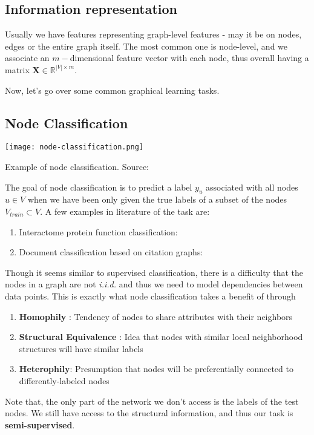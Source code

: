 \subsection{Information representation}
Usually we have features representing graph-level features - may it be on nodes, edges or the entire graph itself. The most common one is node-level, and we associate an $m-$dimensional feature vector with each node, thus overall having a matrix $\mathbf{X} \in \mathbb{R}^{|V| \times m}$.

Now, let's go over some common graphical learning tasks.
\subsection{Node Classification}
	\begin{marginfigure}
	\texttt{[image: node-classification.png]}
	\caption{Example of node classification. Source: \cite{node-classification-survey}}
	\label{fig:node-classification}
\end{marginfigure}
The goal of node classification is to predict a label $y_u$ associated with all nodes $u \in V$ when we have been only given the true labels of a subset of the nodes $V_{train} \subset V$. A few examples in literature of the task are:
\begin{enumerate}
	\item Interactome protein function classification: \cite{graphsage}
	\item Document classification based on citation graphs: \cite{gcn}
\end{enumerate}
Though it seems similar to supervised classification, there is a difficulty that the nodes in a graph are not \textit{i.i.d.} and thus we need to model dependencies between data points. This is exactly what node classification takes a benefit of through 
\begin{enumerate}
	\item \textbf{Homophily} \cite{homophily}: Tendency of nodes to share attributes with their neighbors
	\item \textbf{Structural Equivalence} \cite{structural-equivalence}: Idea that nodes with similar local neighborhood structures will have similar labels
	\item \textbf{Heterophily}: Presumption that nodes will be preferentially connected to differently-labeled nodes
\end{enumerate}
Note that, the only part of the network we don't access is the labels of the test nodes. We still have access to the structural information, and thus our task is \textbf{semi-supervised}.
